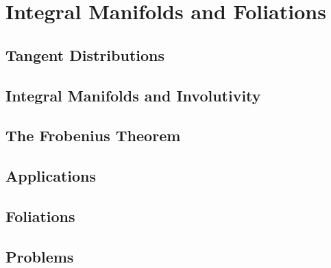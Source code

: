 \chapter{Integral Manifolds and Foliations}
\section{Tangent Distributions}
\section{Integral Manifolds and Involutivity}
\section{The Frobenius Theorem}
\section{Applications}
\section{Foliations}
\section{Problems}
